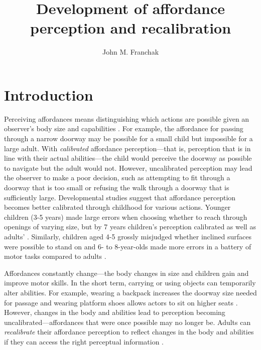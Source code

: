 \documentclass[a4paper,man,natbib,floatsintext,noextraspace]{apa6}
\title{Development of affordance perception and recalibration}
\author{John M. Franchak}
\affiliation{University of California, Riverside}
\begin{document}
\maketitle

\section{Introduction}

Perceiving affordances means distinguishing which actions are possible given an observer's body size and capabilities \citep{Gibson79}. For example, the affordance for passing through a narrow doorway may be possible for a small child but impossible for a large adult. With \textit{calibrated} affordance perception---that is, perception that is in line with their actual abilities---the child would perceive the doorway as possible to navigate but the adult would not. However, uncalibrated perception may lead the observer to make a poor decision, such as attempting to fit through a doorway that is too small or refusing the walk through a doorway that is sufficiently large. Developmental studies suggest that affordance perception becomes better calibrated through childhood for various actions. Younger children (3-5 years) made large errors when choosing whether to reach through openings of varying size, but by 7 years children’s perception calibrated as well as adults' \citep{ChildReaching}. Similarly, children aged 4-5 grossly misjudged whether inclined surfaces were possible to stand on \citep{KlevbergAnderson} and 6- to 8-year-olds made more errors in a battery of motor tasks compared to adults \citep{Plumert95}.  

Affordances constantly change---the body changes in size and children gain and improve motor skills. In the short term, carrying or using objects can temporarily alter abilities. For example, wearing a backpack increases the doorway size needed for passage  and wearing platform shoes allows actors to sit on higher seats \citep{Mark87}. However, changes in the body and abilities lead to perception becoming uncalibrated---affordances that were once possible may no longer be. Adults can \textit{recalibrate} their affordance perception to reflect changes in the body and abilities if they can access the right perceptual information \citep{Recal,DoorwayLearning,Mark87,MarkSitting90}. 
\end{document}
